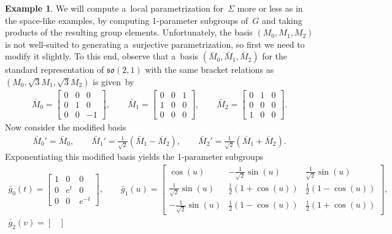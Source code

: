 \documentclass[pdftex]{sigma}
\numberwithin{equation}{section}
\theoremstyle{definition}
\newtheorem{exmpl}[teo]{Example}
\begin{document}
\begin{exmpl}
We will compute a~local parametrization for~$\Sigma$ more or less as in the space-like examples, by computing 1-parameter
subgroups of~$G$ and taking products of the resulting group elements.
Unfortunately, the basis $(M_0, M_1, M_2)$ is not well-suited to generating a~surjective parametrization, so f\/irst we
need to modify it slightly.
To this end, observe that a~basis $(\bar{M}_0, \bar{M}_1, \bar{M}_2)$ for the standard representation of
$\mathfrak{so}(2,1)$ with the same bracket relations as $(M_0, \sqrt{3}M_1, \sqrt{3}M_2)$ is given~by
\begin{gather*}
\bar{M}_0 =
\begin{bmatrix}
0 & 0 & 0
\\
0 & 1 & 0
\\
0 & 0 & -1
\end{bmatrix},
\qquad
\bar{M}_1 =
\begin{bmatrix}
0 & 0 & 1
\\
1 & 0 & 0
\\
0 & 0 & 0
\end{bmatrix},
\qquad
\bar{M}_2 =
\begin{bmatrix}
0 & 1 & 0
\\
0 & 0 & 0
\\
1 & 0 & 0
\end{bmatrix}.
\end{gather*}
Now consider the modif\/ied basis
\begin{gather*}
\bar{M}_0' = \bar{M}_0,
\qquad
\bar{M}_1' = \frac{1}{\sqrt{2}}(\bar{M}_1 - \bar{M}_2),
\qquad
\bar{M}_2' = \frac{1}{\sqrt{2}}(\bar{M}_1 + \bar{M}_2).
\end{gather*}
Exponentiating this modif\/ied basis yields the 1-parameter subgroups
\begin{gather*}
\bar{g}_0(t) =
\begin{bmatrix}
1 & 0 & 0
\\
0 & e^t & 0
\\
0 & 0 & e^{-t}
\end{bmatrix},
\qquad
\bar{g}_1(u) =
\begin{bmatrix}
\cos(u) & -\frac{1}{\sqrt{2}}\sin(u) & \frac{1}{\sqrt{2}}\sin(u)
\\
\frac{1}{\sqrt{2}}\sin(u) & \frac{1}{2}(1 + \cos(u)) & \frac{1}{2}(1 - \cos(u))
\\
-\frac{1}{\sqrt{2}}\sin(u) & \frac{1}{2}(1 - \cos(u)) & \frac{1}{2}(1 + \cos(u))
\end{bmatrix},
\\
\bar{g}_2(v) =
\begin{bmatrix}

\end{bmatrix}
\end{gather*}
\end{exmpl}
\end{document}
